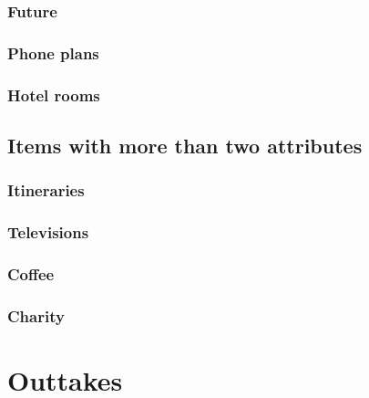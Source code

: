 \documentclass[11pt,letter]{article}
\begin{document}


\subsubsection{Future}



\subsubsection{Phone plans}



\subsubsection{Hotel rooms}



\subsection{Items with more than two attributes}

\subsubsection{Itineraries}



\subsubsection{Televisions}



\subsubsection{Coffee}



\subsubsection{Charity}



\iffalse

\section{Outtakes}
\end{document}
